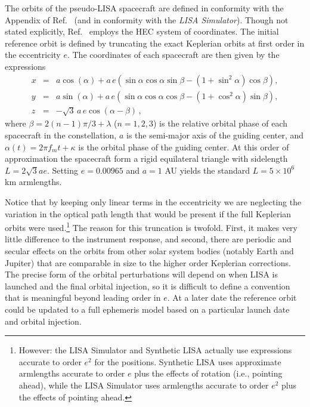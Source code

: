 \documentclass[11pt]{report}
\begin{document}
The orbits of the pseudo-LISA spacecraft are defined in conformity with the Appendix of Ref.~\cite{cr2003}
(and in conformity with the \emph{LISA Simulator}). Though not stated explicitly, Ref.~\cite{cr2003} employs the
HEC system of coordinates. The initial reference orbit is defined by
truncating the exact Keplerian orbits at first order in the eccentricity $e$. The coordinates of each
spacecraft are then given by the expressions
%
\begin{eqnarray}
x &=& a\cos(\alpha) + a \, e\left(\sin\alpha\cos\alpha\sin\beta
-(1+\sin^2\alpha)\cos\beta\right), \nonumber \\
y &=& a\sin(\alpha) + a \, e\left(\sin\alpha\cos\alpha\cos\beta
-(1+\cos^2\alpha)\sin\beta\right), \\
z & = & -\sqrt{3} \, a \, e \cos(\alpha-\beta) \, , \nonumber
\end{eqnarray}
%
where $\beta = 2(n-1)\pi/3 + \lambda$ ($n=1,2,3$) is the relative orbital phase of each spacecraft in the
constellation, $a$ is the semi-major axis of the guiding center, and $\alpha(t)=2\pi f_m t + \kappa$ is
the orbital phase of the guiding center. At this order of approximation the spacecraft form
a rigid equilateral triangle with sidelength $L = 2\sqrt{3} a e$. Setting $e=0.00965$ and $a = 1$ AU yields
the standard $L=5\times 10^6$ km armlengths. 

Notice that by keeping only linear terms in the eccentricity we are neglecting the
variation in the optical path length that would be present if the full Keplerian
orbits were used.\footnote{However: the LISA Simulator and Synthetic LISA actually use expressions
accurate to order $e^2$ for the positions. Synthetic LISA uses approximate armlengths
accurate to order $e$ plus the effects of rotation (i.e., pointing ahead), while the LISA Simulator
uses armlengths accurate to order $e^2$
plus the effects of pointing ahead.} 
The reason for this truncation is twofold. First,
it makes very little difference to the instrument response, and second, there are
periodic and secular effects on the orbits from other solar system bodies (notably
Earth and Jupiter) that are comparable in size to the higher order Keplerian corrections.
The precise form of the orbital perturbations will depend on when LISA is launched
and the final orbital injection, so it is difficult to define a convention that is
meaningful beyond leading order in $e$. At a later date the reference orbit could be
updated to a full ephemeris model based on a particular launch date and orbital
injection.
\end{document}
